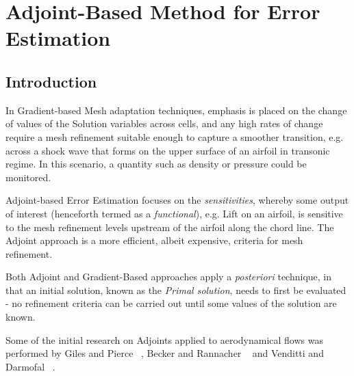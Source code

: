 \section{Adjoint-Based Method for Error Estimation}
\label{section:Adjoint}
\subsection{Introduction}

In Gradient-based Mesh adaptation techniques, emphasis is placed on the change of values of the Solution variables across cells, and any high rates of change require a mesh refinement suitable enough to capture a smoother transition, e.g. across a shock wave that forms on the upper surface of an airfoil in transonic regime. In this scenario, a quantity such as density or pressure could be monitored.\par
Adjoint-based Error Estimation focuses on the \textit{sensitivities}, whereby some output of interest (henceforth termed as a \textit{functional}), e.g. Lift on an airfoil, is sensitive to the mesh refinement levels upstream of the airfoil along the chord line. The Adjoint approach is a more efficient, albeit expensive, criteria for mesh refinement.\par
Both Adjoint and Gradient-Based approaches apply a \textit{posteriori} technique, in that an initial solution, known as the \textit{Primal solution}, needs to first be evaluated - no refinement criteria can be carried out until some values of the solution are known.\par 
Some of the initial research on Adjoints applied to aerodynamical flows was performed by Giles and Pierce ~\cite{Giles:2000}, Becker and Rannacher ~\cite{Becker:2001} and Venditti and Darmofal ~\cite{Venditti:2001}.


